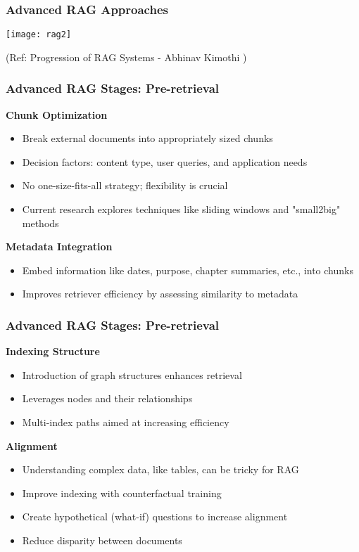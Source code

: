 \begin{frame}[fragile]\frametitle{Advanced RAG Approaches}

\begin{center}
\texttt{[image: rag2]}

{\tiny (Ref: Progression of RAG Systems - Abhinav Kimothi )}
\end{center}	
\end{frame}


\begin{frame}[fragile]\frametitle{Advanced RAG Stages: Pre-retrieval}
\textbf{Chunk Optimization}

  \begin{itemize}
    \item Break external documents into appropriately sized chunks
    \item Decision factors: content type, user queries, and application needs
    \item No one-size-fits-all strategy; flexibility is crucial
    \item Current research explores techniques like sliding windows and "small2big" methods
  \end{itemize}
  
\textbf{Metadata Integration}

  \begin{itemize}
    \item Embed information like dates, purpose, chapter summaries, etc., into chunks
    \item Improves retriever efficiency by assessing similarity to metadata
  \end{itemize}
  

\end{frame}

\begin{frame}[fragile]\frametitle{Advanced RAG Stages: Pre-retrieval}
\textbf{Indexing Structure}
  \begin{itemize}
    \item Introduction of graph structures enhances retrieval
    \item Leverages nodes and their relationships
    \item Multi-index paths aimed at increasing efficiency
  \end{itemize}
  
\textbf{Alignment}
  \begin{itemize}
    \item Understanding complex data, like tables, can be tricky for RAG
    \item Improve indexing with counterfactual training
    \item Create hypothetical (what-if) questions to increase alignment
    \item Reduce disparity between documents
  \end{itemize}
\end{frame}

